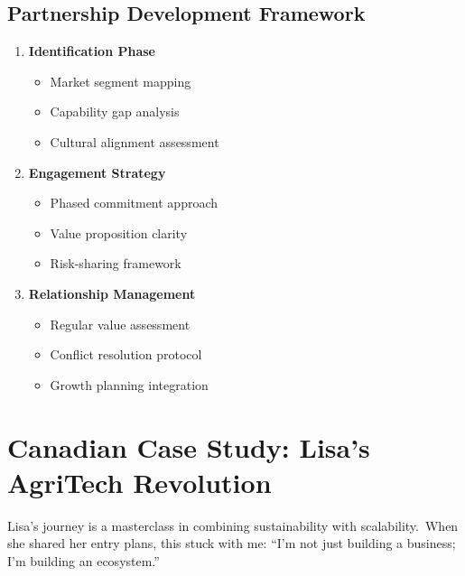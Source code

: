 \subsection{Partnership Development Framework}\label{subsec:partnership-development-framework}
\begin{tcolorbox}[colback=white,colframe=primary,title=\textbf{Ahmed's Partnership Matrix}]
\begin{enumerate}
    \item \textbf{Identification Phase}
    \begin{itemize}
        \item Market segment mapping
        \item Capability gap analysis
        \item Cultural alignment assessment
    \end{itemize}

    \item \textbf{Engagement Strategy}
    \begin{itemize}
        \item Phased commitment approach
        \item Value proposition clarity
        \item Risk-sharing framework
    \end{itemize}

    \item \textbf{Relationship Management}
    \begin{itemize}
        \item Regular value assessment
        \item Conflict resolution protocol
        \item Growth planning integration
    \end{itemize}
\end{enumerate}
\end{tcolorbox}

\section{Canadian Case Study: Lisa's AgriTech Revolution}\label{sec:canadian-case-study:-lisa's-agritech-revolution}

Lisa's journey is a masterclass in combining sustainability with scalability.\ When she shared her entry plans, this stuck with me: ``I'm not just building a business; I'm building an ecosystem.''

